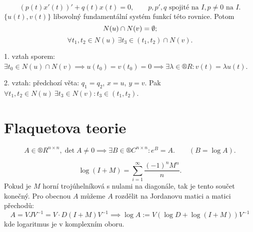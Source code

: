 \documentclass[12pt]{article}					%
\begin{document}
\begin{veta}[Šturnova]
	$$ (p(t)x'(t))' + q(t)x(t) = 0, \qquad p, p', q \text{ spojité na } I, p≠0 \text{ na } I. $$
	$\{u(t), v(t)\}$ libovolný fundamentální systém funkcí této rovnice. Potom
	$$ N(u) \cap N(v) = \emptyset; $$
	$$ \forall t_1, t_2 \in N(u)\ \exists t_3 \in (t_1, t_2) \cap N(v). $$

	\begin{dukazin}
		1. vztah sporem: $\exists t_0 \in N(u) \cap N(v) \implies u(t_0) = v(t_0) = 0 \implies \exists \lambda \in ®R: v(t) = \lambda u(t)$.

		2. vztah: předchozí věta: $q_1 = q_2$, $x = u$, $y  = v$. Pak $\forall t_1, t_2 \in N(u)\ \exists t_3 \in N(v): t_3 \in (t_1, t_2)$.
	\end{dukazin}
\end{veta}

\section{Flaquetova teorie}
\begin{lemma}
	$$ A \in ®R^{n \times n}, \det A ≠ 0 \implies \exists B \in ®C^{n \times n}: e^B = A. \qquad (B = \log A). $$

	\begin{dukazin}
		$$ \log(I + M) = \sum_{i=1}^∞ \frac{(-1)^n M^n}{n}. $$
		Pokud je $M$ horní trojúhelníková s nulami na diagonále, tak je tento součet konečný. Pro obecnou $A$ můžeme $A$ rozdělit na Jordanovu matici a matici přechodů:
		$$ A = VJV^{-1} = V·D(I + M)V^{-1} \implies \log A := V(\log D + \log(I + M))V^{-1} $$
		kde logaritmus je v komplexním oboru.
	\end{dukazin}
\end{lemma}
\end{document}
